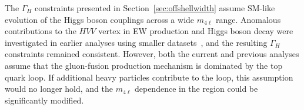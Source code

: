

The $\Gamma_H$ constraints presented in Section~\ref{sec:offshellwidth} assume SM-like evolution of the Higgs boson couplings across a wide $m_{4\ell}$ range. Anomalous contributions to the $HVV$ vertex in EW production and Higgs boson decay were investigated in earlier analyses using smaller datasets~\cite{Sirunyan:2019twz,CMS:2022ley}, and the resulting $\Gamma_H$ constraints remained consistent. However, both the current and previous analyses assume that the gluon-fusion production mechanism is dominated by the top quark loop. If additional heavy particles contribute to the loop, this assumption would no longer hold, and the $m_{4\ell}$ dependence in the \offshell region could be significantly modified.

